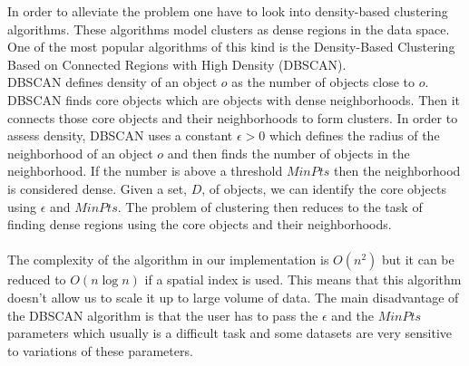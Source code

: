 In order to alleviate the problem one have to look into density-based clustering algorithms. These algorithms model clusters as dense regions in the data space. One of the most popular algorithms of this kind is the Density-Based Clustering Based on Connected Regions with High Density (DBSCAN). \\ 
DBSCAN defines density of an object $o$ as the number of objects close to $o$. DBSCAN finds core objects which are objects with dense neighborhoods. Then it connects those core objects and their neighborhoods to form clusters. In order to assess density, DBSCAN uses a constant $\epsilon  > 0$ which defines the radius of the neighborhood of an object $o$ and then finds the number of objects in the neighborhood. If the number is above a threshold $MinPts$ then the neighborhood is considered dense. Given a set, $D$, of objects, we can identify the core objects using $\epsilon$ and $MinPts$. The problem of clustering then reduces to the task of finding dense regions using the core objects and their neighborhoods. \\\\
The complexity of the algorithm in our implementation is $O(n^2)$ but it can be reduced to $O(n\log n)$ if a spatial index is used. This means that this algorithm doesn't allow us to scale it up to large volume of data. The main disadvantage of the DBSCAN algorithm is that the user has to pass the $\epsilon $ and the $MinPts$ parameters which usually is a difficult task and some datasets are very sensitive to variations of these parameters. 

